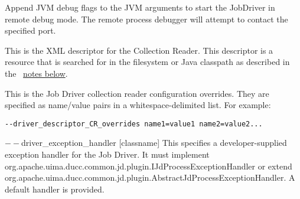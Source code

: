 \begin{description}
           \item[$--$driver\_debug {[debug-port]}] Append JVM debug flags to the JVM arguments
             to start the JobDriver in remote debug mode.  The remote process debugger will attempt
             to contact the specified port.

           \item[$--$driver\_descriptor\_CR {[descriptor.xml]} ] This is the XML descriptor for the
             Collection Reader.  This 
             descriptor is a resource that is searched for in the filesystem or Java classpath as described 
             in the ~\hyperref[par:cli.submit.notes]{notes below}.

           \item[$--$driver\_descriptor\_CR\_overrides {[list]} ]             
             This is the Job Driver collection reader configuration overrides. They are specified as 
             name/value pairs in a whitespace-delimited list. For example: 
             \begin{verbatim}
--driver_descriptor_CR_overrides name1=value1 name2=value2...
             \end{verbatim}
             
             
%
%             

           \begin{sloppypar}
           \item[$--$driver\_exception\_handler {[classname]}] This specifies a developer-supplied
             exception handler for the Job Driver.  It must
             implement org.apache.uima.ducc.common.jd.plugin.IJdProcessExceptionHandler or extend
             org.apache.uima.ducc.common.jd.plugin.AbstractJdProcessExceptionHandler.  A default
             handler is provided.
           \end{sloppypar}
           

\end{description}
